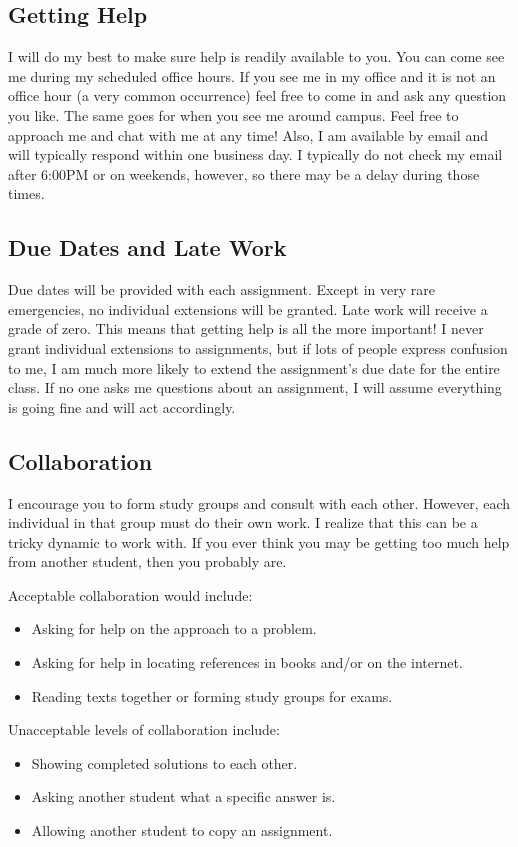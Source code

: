 \documentclass[11pt]{article}
\begin{document}
\subsection*{Getting Help}
I will do my best to make sure help is readily available to you. You
can come see me during my scheduled office hours. If you see me in my
office and it is not an office hour (a very common occurrence) feel
free to come in and ask any question you like. The same goes for when
you see me around campus. Feel free to approach me and chat with me at
any time! Also, I am available by email and will typically respond
within one business day. I typically do not check my email after
6:00PM or on weekends, however, so there may be a delay during those
times.

\subsection*{Due Dates and Late Work}
Due dates will be provided with each assignment. Except in very rare
emergencies, no individual extensions will be granted. Late work will
receive a grade of zero. This means that getting help is all
the more important! I never grant individual extensions to
assignments, but if lots of people express confusion to me, I am much
more likely to extend the assignment's due date for the entire
class. If no one asks me questions about an assignment, I will assume
everything is going fine and will act accordingly.

\subsection*{Collaboration}
I encourage you to form study groups and consult with each other.
However, each individual in that group must do their own work.
I realize that this can be a tricky dynamic to work with. If you ever
think you may be getting too much help from another student, then you
probably are.

Acceptable collaboration would include:
\begin{itemize}
\item Asking for help on the approach to a problem.
\item Asking for help in locating references in books and/or on the internet.
\item Reading texts together or forming study groups for exams.
\end{itemize}

Unacceptable levels of collaboration include:
\begin{itemize}
\item Showing completed solutions to each other.
\item Asking another student what a specific answer is.
\item Allowing another student to copy an assignment.
\end{itemize}
\end{document}
